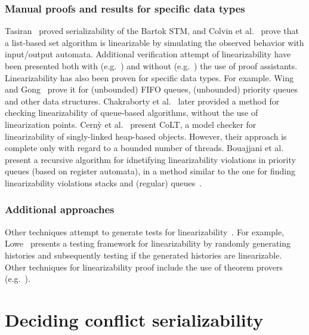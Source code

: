 \subsubsection{Manual proofs and results for specific data types}

Tasiran~\cite{Ta08} proved serializability of the Bartok STM, and Colvin et 
al.~\cite{CoGrLuMo06} prove that a list-based set algorithm is linearizable by 
simulating the observed behavior with input/output automata.
%
%
Additional verification attempt of linearizability have been presented both 
with (e.g.~\cite{CoGrLuMo06}) and without (e.g.~\cite{DoGrLuMo04}) the use of 
proof assistants.
%
Linearizability has also been proven for specific data types. For example. 
Wing and Gong~\cite{WiGo93} prove it for  (unbounded) FIFO queues, (unbounded) 
priority queues and other data structures. Chakraborty et al.~\cite{ChHeSeVa15} 
later provided a method for checking linearizability of queue-based algorithms, 
without the use of linearization points. Cern{\`y} et al.~\cite{CeRaZuChAl10} 
present CoLT, a model checker for linearizability of singly-linked heap-based 
objects. However, their approach is complete only with regard to a bounded 
number of threads. 
%
Bouajjani et al.~\cite{BoEnWa17} present a recursive algorithm for idnetifying 
linearizability violations in priority queues (based on register automata), in 
a method similar to the one for finding linearizability violations stacks and 
(regular) queues~\cite{BoEmEnHa18}.


\subsubsection{Additional approaches}

Other techniques attempt to generate tests for linearizability~\cite{WiGo93, 
PrGr12, PrGr13, EmEn17}. For example, 
Lowe~\cite{Lo17} presents a testing framework for linearizability by randomly 
generating histories and subsequently testing if the generated histories are 
linearizable.
%
Other techniques for linearizability proof include the use of theorem provers 
(e.g.~\cite{CoDoGr05, DeScWe11}).



\section{Deciding conflict serializability}

